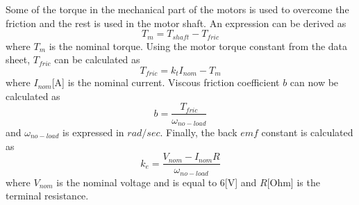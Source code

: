 Some of the torque in the mechanical part of the motors is used to overcome the friction and the rest is used in the motor shaft. An expression can be derived as
 \begin{equation*}
 T_{m} = T_{shaft} - T_{fric}
 \end{equation*}
  where $T_{m}$ is the nominal torque. Using the motor torque constant from the data sheet, $T_{fric}$ can be calculated as 
 \begin{equation*}
 T_{fric}	= k_{t} I_{nom} - T_{m} 
 \end{equation*}    
where $I_{nom} $[A] is the nominal current. Viscous friction coefficient $b$ can now be calculated as
\begin{equation*}
	b	= \frac{T_{fric} }{\omega_{no-load}}
\end{equation*}
and $\omega_{no-load}$ is expressed in $rad/sec$. Finally, the back $emf$ constant is calculated as
\begin{equation*}
	k_{e}	= \frac{V_{nom} - I_{nom}R}{\omega_{no-load}}
\end{equation*}
where $V_{nom}$ is the nominal voltage and is equal to 6[V] and  $R$[Ohm] is the terminal resistance. 